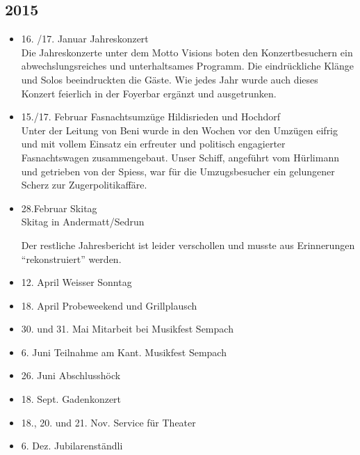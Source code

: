 \subsection{2015}
\begin{history}


      \begin{itemize}

            \item 16. /17. Januar Jahreskonzert\\
                  Die Jahreskonzerte unter dem Motto Visions boten den Konzertbesuchern
                  ein abwechslungsreiches und unterhaltsames Programm. Die eindrückliche
                  Klänge und Solos beeindruckten die Gäste. Wie jedes Jahr wurde auch
                  dieses Konzert feierlich in der Foyerbar ergänzt und ausgetrunken.

            \item 15./17. Februar Fasnachtsumzüge Hildisrieden und Hochdorf\\
                  Unter der Leitung von Beni wurde in den Wochen vor den Umzügen eifrig
                  und mit vollem Einsatz ein erfreuter und politisch engagierter
                  Fasnachtswagen zusammengebaut. Unser Schiff, angeführt vom Hürlimann und
                  getrieben von der Spiess, war für die Umzugsbesucher ein gelungener
                  Scherz zur Zugerpolitikaffäre.

            \item 28.Februar Skitag\\
                  Skitag in Andermatt/Sedrun

                  Der restliche Jahresbericht ist leider verschollen und musste aus Erinnerungen \enquote{rekonstruiert} werden.

            \item 12. April Weisser Sonntag
            \item 18. April Probeweekend und Grillplausch
            \item 30. und 31. Mai Mitarbeit bei Musikfest Sempach
            \item 6. Juni Teilnahme am Kant. Musikfest Sempach
            \item 26. Juni Abschlusshöck
            \item 18. Sept. Gadenkonzert
            \item 18., 20. und 21. Nov. Service für Theater
            \item 6. Dez. Jubilarenständli

      \end{itemize}

\end{history}
